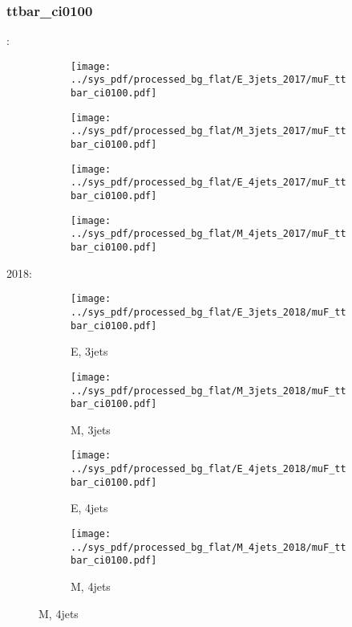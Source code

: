 \documentclass{beamer}
\begin{document}
\begin{frame}
\frametitle{ttbar_ci0100}
\fontsize{5}{1}:
\begin{figure}
\centering
\begin{subfigure}[b]{0.24\textwidth}
\texttt{[image: ../sys\_pdf/processed\_bg\_flat/E\_3jets\_2017/muF\_ttbar\_ci0100.pdf]}
\end{subfigure}
\begin{subfigure}[b]{0.24\textwidth}
\texttt{[image: ../sys\_pdf/processed\_bg\_flat/M\_3jets\_2017/muF\_ttbar\_ci0100.pdf]}
\end{subfigure}
\begin{subfigure}[b]{0.24\textwidth}
\texttt{[image: ../sys\_pdf/processed\_bg\_flat/E\_4jets\_2017/muF\_ttbar\_ci0100.pdf]}
\end{subfigure}
\begin{subfigure}[b]{0.24\textwidth}
\texttt{[image: ../sys\_pdf/processed\_bg\_flat/M\_4jets\_2017/muF\_ttbar\_ci0100.pdf]}
\end{subfigure}
\end{figure}
2018:
\begin{figure}
\centering
\begin{subfigure}[b]{0.24\textwidth}
\texttt{[image: ../sys\_pdf/processed\_bg\_flat/E\_3jets\_2018/muF\_ttbar\_ci0100.pdf]}
\captionsetup{font=tiny}
\caption{E, 3jets}
\end{subfigure}
\begin{subfigure}[b]{0.24\textwidth}
\texttt{[image: ../sys\_pdf/processed\_bg\_flat/M\_3jets\_2018/muF\_ttbar\_ci0100.pdf]}
\captionsetup{font=tiny}
\caption{M, 3jets}
\end{subfigure}
\begin{subfigure}[b]{0.24\textwidth}
\texttt{[image: ../sys\_pdf/processed\_bg\_flat/E\_4jets\_2018/muF\_ttbar\_ci0100.pdf]}
\captionsetup{font=tiny}
\caption{E, 4jets}
\end{subfigure}
\begin{subfigure}[b]{0.24\textwidth}
\texttt{[image: ../sys\_pdf/processed\_bg\_flat/M\_4jets\_2018/muF\_ttbar\_ci0100.pdf]}
\captionsetup{font=tiny}
\caption{M, 4jets}
\end{subfigure}
\end{figure}
\end{frame}
\end{document}
